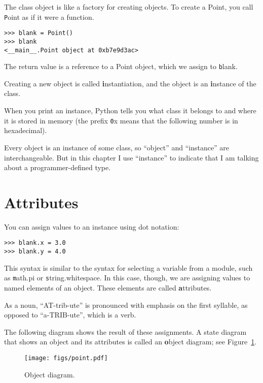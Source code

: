 \documentclass[
DIV=11,
fontsize=12,
twoside,
headinclude=false,
titlepage=firstiscover,
abstract=true,
headsepline=true,
footsepline=true,
chapterprefix=true, %
headings=big,
bibliography=totoc,%
captions=tableheading
]{scrbook}
\theoremstyle{definition}
\begin{document}
The class object is like a factory for creating objects.  To create a
Point, you call {\texttt Point} as if it were a function.

\begin{lstlisting}
>>> blank = Point()
>>> blank
<__main__.Point object at 0xb7e9d3ac>
\end{lstlisting}
%
The return value is a reference to a Point object, which we
assign to {\texttt blank}.  

Creating a new object is called
{\textbf instantiation}, and the object is an {\textbf instance} of
the class.

When you print an instance, Python tells you what class it
belongs to and where it is stored in memory (the prefix
{\texttt 0x} means that the following number is in hexadecimal).

Every object is an instance of some class, so ``object'' and
``instance'' are interchangeable.  But in this chapter I use
``instance'' to indicate that I am talking about a programmer-defined
type.


\section{Attributes}
\label{attributes}

You can assign values to an instance using dot notation:

\begin{lstlisting}
>>> blank.x = 3.0
>>> blank.y = 4.0
\end{lstlisting}
%
This syntax is similar to the syntax for selecting a variable from a
module, such as {\texttt math.pi} or {\texttt string.whitespace}.  In this case,
though, we are assigning values to named elements of an object.
These elements are called {\textbf attributes}.

As a noun, ``AT-trib-ute'' is pronounced with emphasis on the first
syllable, as opposed to ``a-TRIB-ute'', which is a verb.

The following diagram shows the result of these assignments.
A state diagram that shows an object and its attributes is
called an {\textbf object diagram}; see Figure~\ref{fig.point}.

\begin{figure}
\centerline
{\texttt{[image: figs/point.pdf]}}
\caption{Object diagram.}
\label{fig.point}
\end{figure}
\end{document}
